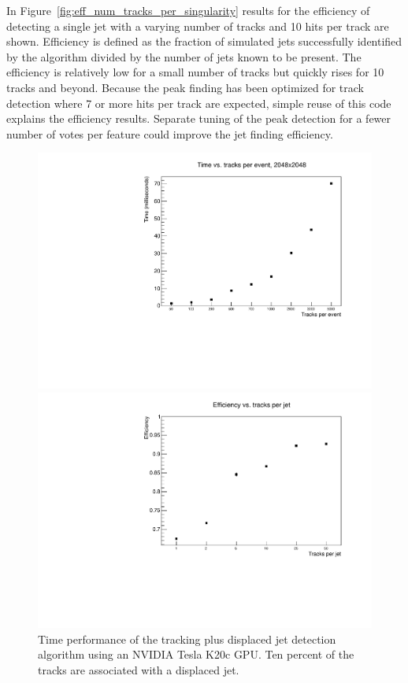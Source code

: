 \documentclass[preprint,sort&compress]{elsarticle}
\begin{document}
In Figure~\ref{fig:eff_num_tracks_per_singularity} results for the efficiency of detecting a single jet with a varying number of tracks and 10 hits per track are shown.  Efficiency is defined as the fraction of simulated jets successfully identified by the algorithm divided by the number of jets known to be present.  The efficiency is relatively low for a small number of tracks but quickly rises for 10 tracks and beyond.  Because the peak finding has been optimized for track detection where 7 or more hits per track are expected, simple reuse of this code explains the efficiency results.  Separate tuning of the peak detection for a fewer number of votes per feature could improve the jet finding efficiency.
%
\begin{figure}[!Hhtb]
\begin{minipage}[t]{5.6cm}
\begin{center}
\includegraphics[width=1. \textwidth]{performance.pdf}
 \caption{Time performance of the tracking plus displaced jet detection algorithm using an NVIDIA Tesla K20c GPU.  
          Ten percent of the tracks are associated with a displaced jet. \label{fig:performance}}
\end{center}
\end{minipage}\quad
\begin{minipage}[t]{5.7cm}
\begin{center}
\includegraphics[width=1.\textwidth]{eff_num_tracks_per_singularity.pdf} 

\end{center}
\end{minipage}
\end{figure}
\end{document}
